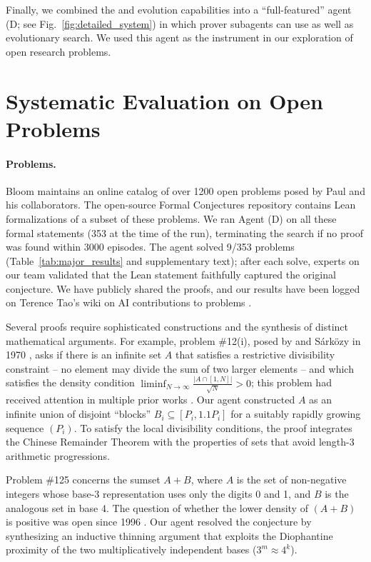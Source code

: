 Finally, we combined the {\AP} and evolution capabilities into a ``full-featured'' agent (D; see Fig.~\ref{fig:detailed_system}) in which prover subagents can use {\AP} as well as evolutionary search. We used this agent as the instrument in our exploration of open research problems. 

\section{Systematic Evaluation on Open Problems}



\paragraph{{\erdos} Problems.} 

Bloom maintains an online catalog \cite{erdosproblems} of over 1200 open problems posed by Paul {\erdos} and his collaborators.
The open-source Formal Conjectures repository \cite{deepmind2026formalconjectures} contains Lean formalizations of a subset of these problems.
We ran Agent (D) on all these formal statements (353 at the time of the run), terminating the search if no proof was found within 3000 episodes. The agent solved 9/353 problems (Table~\ref{tab:major_results} and supplementary text); after each solve, experts on our team validated that the Lean statement faithfully captured the original conjecture. We have publicly shared the proofs, and our results have been logged on Terence Tao's wiki on AI contributions to {\erdos} problems \cite{TaoErdosWiki}. 

Several proofs require sophisticated constructions and the synthesis of distinct mathematical arguments. For example, problem \#12(i), posed by {\erdos} and S\'ark\"ozy in 1970 \cite{Erds1970OnTD}, asks if there is an infinite set $A$ that satisfies a restrictive divisibility constraint -- no element may divide the sum of two larger elements -- and which satisfies the density condition $\liminf_{N \to \infty} \frac{|A \cap [1, N]|}{\sqrt{N}} > 0$; this problem had received attention in multiple prior works \cite{elsholtz2016erd, SCHOEN2001191, Baier2004ANO}. Our agent constructed $A$ as an infinite union of disjoint ``blocks'' $B_i \subseteq [P_i, 1.1P_i]$ for a suitably rapidly growing sequence $(P_i)$. To satisfy the local divisibility conditions, the proof integrates the Chinese Remainder Theorem with the properties of sets that avoid length-3 arithmetic progressions. 

Problem \#125 concerns the sumset $A+B$, where $A$ is the set of non-negative integers whose base-3 representation uses only the digits 0 and 1, and $B$ is the analogous set in base 4.  
The question of whether the lower density of $(A + B)$ is positive was open since 1996 \cite{BurrErdos125}. 
Our agent resolved the conjecture by synthesizing an inductive thinning argument that exploits the Diophantine proximity of the two multiplicatively independent bases ($3^m \approx 4^k$). 

